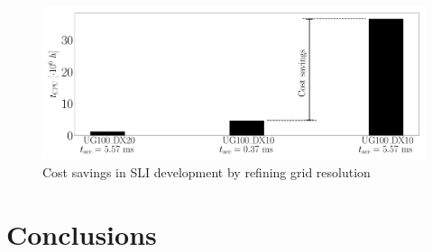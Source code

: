 \begin{figure}[ht]
   \centering
   \includegraphics[scale=0.215]{./part2_developments/figures_ch5_resolved_JICF/SLI_cost_for_convergence/cost_savings_simulations}
   \caption{Cost savings in SLI development by refining grid resolution}
   \label{fig:SLI_cost_convergence_savings}
\end{figure}


\section{Conclusions}


